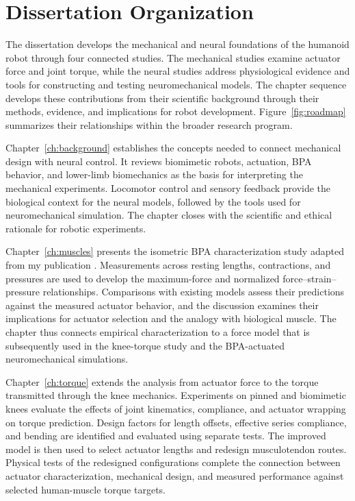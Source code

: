 \section{Dissertation Organization}\label{sec:organization}
\begingroup
{}

The dissertation develops the mechanical and neural foundations of the humanoid robot through four connected studies. The mechanical studies examine actuator force and joint torque, while the neural studies address physiological evidence and tools for constructing and testing neuromechanical models. The chapter sequence develops these contributions from their scientific background through their methods, evidence, and implications for robot development. Figure~\ref{fig:roadmap} summarizes their relationships within the broader research program.

Chapter~\ref{ch:background} establishes the concepts needed to connect mechanical design with neural control. It reviews biomimetic robots, actuation, BPA behavior, and lower-limb biomechanics as the basis for interpreting the mechanical experiments. Locomotor control and sensory feedback provide the biological context for the neural models, followed by the tools used for neuromechanical simulation. The chapter closes with the scientific and ethical rationale for robotic experiments.

Chapter~\ref{ch:muscles} presents the isometric BPA characterization study adapted from my publication \citep{bolen_2026}. Measurements across resting lengths, contractions, and pressures are used to develop the maximum-force and normalized force--strain--pressure relationships. Comparisons with existing models assess their predictions against the measured actuator behavior, and the discussion examines their implications for actuator selection and the analogy with biological muscle. The chapter thus connects empirical characterization to a force model that is subsequently used in the knee-torque study and the BPA-actuated neuromechanical simulations.

Chapter~\ref{ch:torque} extends the analysis from actuator force to the torque transmitted through the knee mechanics. Experiments on pinned and biomimetic knees evaluate the effects of joint kinematics, compliance, and actuator wrapping on torque prediction. Design factors for length offsets, effective series compliance, and bending are identified and evaluated using separate tests. The improved model is then used to select actuator lengths and redesign musculotendon routes. Physical tests of the redesigned configurations complete the connection between actuator characterization, mechanical design, and measured performance against selected human-muscle torque targets.

